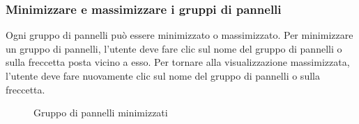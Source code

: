\subsubsection{Minimizzare e massimizzare i gruppi di pannelli}
Ogni gruppo di pannelli può essere minimizzato o massimizzato. Per minimizzare un gruppo di pannelli, l'utente deve fare clic sul nome del gruppo di pannelli o sulla freccetta posta vicino a esso. Per tornare alla visualizzazione massimizzata, l'utente deve fare nuovamente clic sul nome del gruppo di pannelli o sulla freccetta.\\
\begin{figure}[H]
    \centering
    \caption{Gruppo di pannelli minimizzati}
    \label{fig:my_label}
\end{figure}